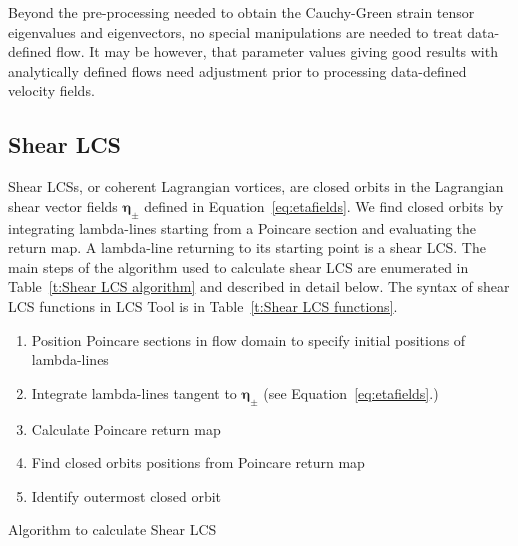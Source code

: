\documentclass{article}
\begin{document}
Beyond the pre-processing needed to obtain the Cauchy-Green strain tensor eigenvalues and eigenvectors, no special manipulations are needed to treat data-defined flow. It may be however, that parameter values giving good results with analytically defined flows need adjustment prior to processing data-defined velocity fields.

\subsection{Shear LCS}

Shear LCSs, or coherent Lagrangian vortices, are closed orbits in the Lagrangian shear vector fields $\boldsymbol \eta_{\pm}$ defined in Equation~\eqref{eq:etafields}. We find closed orbits by integrating lambda-lines starting from a Poincare section and evaluating the return map. A lambda-line returning to its starting point is a shear LCS. The main steps of the algorithm used to calculate shear LCS are enumerated in Table~\ref{t:Shear LCS algorithm} and described in detail below. The syntax of shear LCS functions in LCS Tool is in Table~\ref{t:Shear LCS functions}.

\begin{table}
\begin{center}
\begin{enumerate}
\item Position Poincare sections in flow domain to specify initial positions of lambda-lines
\item Integrate lambda-lines tangent to $\boldsymbol \eta_{\pm}$ (see Equation~\eqref{eq:etafields}.)
\item Calculate Poincare return map
\item Find closed orbits positions from Poincare return map
\item Identify outermost closed orbit
\end{enumerate}
\end{center}
\caption{Algorithm to calculate Shear LCS}
\label{t:Shear LCS algorithm}
\end{table}
\end{document}
